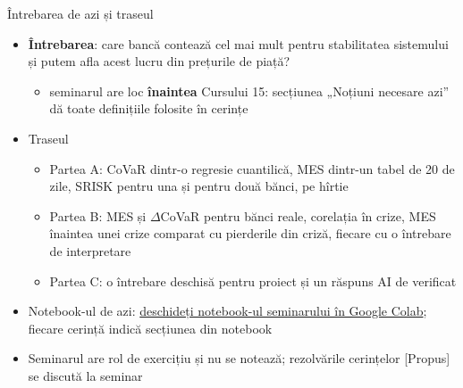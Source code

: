 \begin{frame}{Întrebarea de azi și traseul}
\itemsize{\small}
\begin{itemize}
    \item \textbf{Întrebarea}: care bancă contează cel mai mult pentru stabilitatea sistemului și putem afla acest lucru din prețurile de piață?
    \begin{itemize}
        \item seminarul are loc \textbf{înaintea} Cursului 15: secțiunea „Noțiuni necesare azi” dă toate definițiile folosite în cerințe
    \end{itemize}
    \item Traseul
    \begin{itemize}
        \item Partea A: CoVaR dintr-o regresie cuantilică, MES dintr-un tabel de 20 de zile, SRISK pentru una și pentru două bănci, pe hîrtie
        \item Partea B: MES și $\Delta$CoVaR pentru bănci reale, corelația în crize, MES înaintea unei crize comparat cu pierderile din criză, fiecare cu o întrebare de interpretare
        \item Partea C: o întrebare deschisă pentru proiect și un răspuns AI de verificat
    \end{itemize}
    \item Notebook-ul de azi: \href{\nb}{deschideți notebook-ul seminarului în Google Colab}; fiecare cerință indică secțiunea din notebook
    \item Seminarul are rol de exercițiu și nu se notează; rezolvările cerințelor [Propus] se discută la seminar
\end{itemize}
\end{frame}

